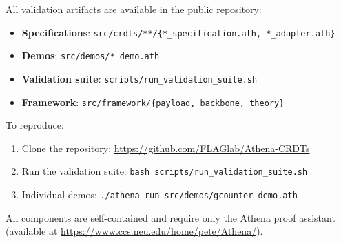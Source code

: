 All validation artifacts are available in the public repository:

\begin{itemize}
  \item \textbf{Specifications}: \texttt{src/crdts/**/\{*\_specification.ath, *\_adapter.ath\}}
  \item \textbf{Demos}: \texttt{src/demos/*\_demo.ath}
  \item \textbf{Validation suite}: \texttt{scripts/run\_validation\_suite.sh}
  \item \textbf{Framework}: \texttt{src/framework/\{payload, backbone, theory\}}
\end{itemize}

To reproduce:
\begin{enumerate}
  \item Clone the repository: \url{https://github.com/FLAGlab/Athena-CRDTs}
  \item Run the validation suite: \texttt{bash scripts/run\_validation\_suite.sh}
  \item Individual demos: \texttt{./athena-run src/demos/gcounter\_demo.ath}
\end{enumerate}

All components are self-contained and require only the Athena proof assistant (available at \url{https://www.ccs.neu.edu/home/pete/Athena/}).

\endinput
